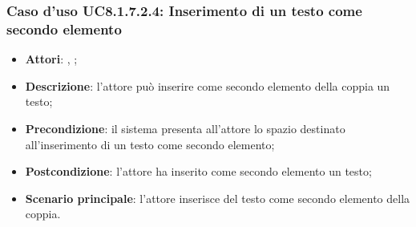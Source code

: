 		\subsubsection{Caso d'uso UC8.1.7.2.4: Inserimento di un testo come secondo elemento}
		\begin{itemize}
			\item \textbf{Attori}: \uau, \uaupro;
			\item \textbf{Descrizione}: l'attore può inserire come secondo elemento della coppia un testo;
			\item \textbf{Precondizione}: il sistema presenta all'attore lo spazio destinato all'inserimento di un testo come secondo elemento;
			\item \textbf{Postcondizione}: l'attore ha inserito come secondo elemento un testo;
			\item \textbf{Scenario principale}: l'attore inserisce del testo come secondo elemento della coppia.
		\end{itemize}
	
